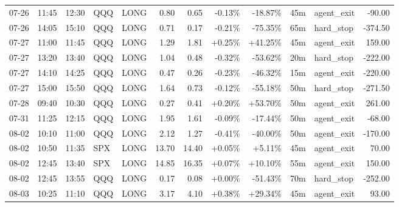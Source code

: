 \documentclass[11pt,a4paper,twoside]{article}
\begin{document}
\begin{center}
\begin{longtable}{>{\color{txtmain}}l l l l l r r r r r >{\color{txtmain}}l r}
07-26 & 11:45 & 12:30 & QQQ & LONG & 0.80 & 0.65 & \textcolor{lossred}{-0.13\%} & \textcolor{lossred}{-18.87\%} & 45m & agent\_exit & \textcolor{lossred}{-90.00} \\
07-26 & 14:05 & 15:10 & QQQ & LONG & 0.71 & 0.17 & \textcolor{lossred}{-0.21\%} & \textcolor{lossred}{-75.35\%} & 65m & hard\_stop & \textcolor{lossred}{-374.50} \\
07-27 & 11:00 & 11:45 & QQQ & LONG & 1.29 & 1.81 & \textcolor{wingreen}{+0.25\%} & \textcolor{wingreen}{+41.25\%} & 45m & agent\_exit & \textcolor{wingreen}{159.00} \\
07-27 & 13:20 & 13:40 & QQQ & LONG & 1.04 & 0.48 & \textcolor{lossred}{-0.32\%} & \textcolor{lossred}{-53.62\%} & 20m & hard\_stop & \textcolor{lossred}{-222.00} \\
07-27 & 14:10 & 14:25 & QQQ & LONG & 0.47 & 0.26 & \textcolor{lossred}{-0.23\%} & \textcolor{lossred}{-46.32\%} & 15m & agent\_exit & \textcolor{lossred}{-220.00} \\
07-27 & 15:00 & 15:50 & QQQ & LONG & 1.64 & 0.73 & \textcolor{lossred}{-0.12\%} & \textcolor{lossred}{-55.18\%} & 50m & hard\_stop & \textcolor{lossred}{-271.50} \\
07-28 & 09:40 & 10:30 & QQQ & LONG & 0.27 & 0.41 & \textcolor{wingreen}{+0.20\%} & \textcolor{wingreen}{+53.70\%} & 50m & agent\_exit & \textcolor{wingreen}{261.00} \\
07-31 & 11:25 & 12:15 & QQQ & LONG & 1.95 & 1.61 & \textcolor{lossred}{-0.09\%} & \textcolor{lossred}{-17.44\%} & 50m & agent\_exit & \textcolor{lossred}{-68.00} \\
08-02 & 10:10 & 11:00 & QQQ & LONG & 2.12 & 1.27 & \textcolor{lossred}{-0.41\%} & \textcolor{lossred}{-40.00\%} & 50m & agent\_exit & \textcolor{lossred}{-170.00} \\
08-02 & 10:50 & 11:35 & SPX & LONG & 13.70 & 14.40 & \textcolor{wingreen}{+0.05\%} & \textcolor{wingreen}{+5.11\%} & 45m & agent\_exit & \textcolor{wingreen}{70.00} \\
08-02 & 12:45 & 13:40 & SPX & LONG & 14.85 & 16.35 & \textcolor{wingreen}{+0.07\%} & \textcolor{wingreen}{+10.10\%} & 55m & agent\_exit & \textcolor{wingreen}{150.00} \\
08-02 & 12:45 & 13:55 & QQQ & LONG & 0.17 & 0.08 & \textcolor{wingreen}{+0.00\%} & \textcolor{lossred}{-51.43\%} & 70m & hard\_stop & \textcolor{lossred}{-252.00} \\
08-03 & 10:25 & 11:10 & QQQ & LONG & 3.17 & 4.10 & \textcolor{wingreen}{+0.38\%} & \textcolor{wingreen}{+29.34\%} & 45m & agent\_exit & \textcolor{wingreen}{93.00} \\

\end{longtable}
\end{center}
\end{document}
